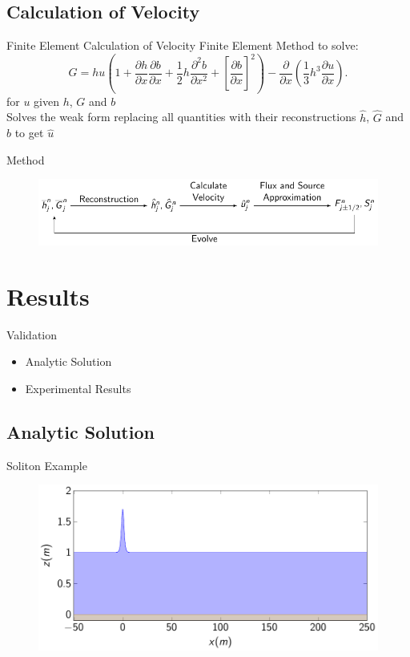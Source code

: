 \documentclass[pdf]{beamer}
\begin{document}
\subsection{Calculation of Velocity}
\begin{frame}{Finite Element Calculation of Velocity}
	Finite Element Method to solve:
		\[ G =  h {u} \left(1 + \frac{\partial h}{\partial x}\frac{\partial b}{\partial x} + \frac{1}{2}h\frac{\partial^2 b}{\partial x^2} + \left[\frac{\partial b}{\partial x}\right]^2 \right) - \frac{\partial}{\partial x}\left(\frac{1}{3}h^3  \frac{\partial {u}}{\partial x}\right).\]
	for $u$ given $h$, $G$ and $b$ \\ \bigskip \pause 
	Solves the weak form replacing all quantities with their reconstructions $\hat{h}$, $\hat{G}$ and $\hat{b}$ to get $\hat{u}$
\end{frame}
\begin{frame}{Method}
		\begin{figure}
			\includegraphics[width=1\textwidth]{./Pics/Tex/FlowCharts/FEVMblack.pdf}
		\end{figure}
\end{frame}

\section{Results}
\begin{frame}[label=valid]{Validation}
	\begin{itemize}
		\item Analytic Solution
		\pause
		\item Experimental Results
	\end{itemize}
\end{frame}
\subsection{Analytic Solution}
\begin{frame}{Soliton Example}
		\begin{figure}
			\includegraphics[width=\textwidth]{./Pics/Init/SolitonAnalytict=0s.pdf}
		\end{figure}
	
\end{frame}
\end{document}
